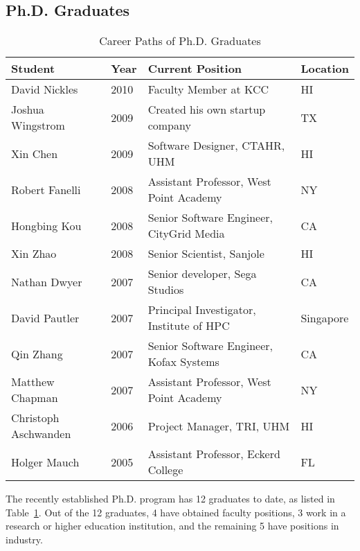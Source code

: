 \documentclass[12pt]{article}
\begin{document}
\subsection{Ph.D. Graduates}
\label{sec.paths.phd}

\begin{table}[Htb]
\caption{Career Paths of Ph.D. Graduates}
\label{tab.phd}
\begin{tabular}{|l|l|l|l|}
\hline
Student & Year & Current Position & Location \\
\hline
David Nickles & 2010 & Faculty Member at KCC & HI \\
Joshua Wingstrom & 2009 & Created his own startup company & TX\\
Xin Chen & 2009 & Software Designer, CTAHR, UHM & HI\\
Robert Fanelli & 2008 & Assistant Professor, West Point Academy & NY\\
Hongbing Kou & 2008 & Senior Software Engineer, CityGrid Media &  CA\\
Xin Zhao & 2008 & Senior Scientist, Sanjole & HI\\
Nathan Dwyer & 2007 & Senior developer, Sega Studios & CA\\
David Pautler & 2007 & Principal Investigator, Institute of HPC & Singapore\\
Qin Zhang & 2007 & Senior Software Engineer, Kofax Systems & CA\\
Matthew Chapman & 2007 & Assistant Professor, West Point Academy & NY\\
Christoph Aschwanden & 2006 & Project Manager, TRI, UHM & HI\\
Holger Mauch & 2005 & Assistant Professor, Eckerd College & FL\\
\hline
\end{tabular}
\end{table}

The recently established Ph.D. program has 12 graduates to date, as
listed in Table~\ref{tab.phd}.  Out of the 12 graduates, 4 have
obtained faculty positions, 3 work in a research or higher education
institution, and the remaining 5 have positions in industry.
\end{document}
